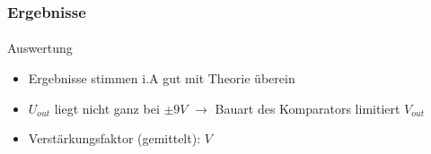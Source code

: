 \begin{frame}
\frametitle{Ergebnisse}
\framesubtitle{} 
    \begin{block}{Auswertung}
        \begin{itemize}
            \item Ergebnisse stimmen i.A gut mit Theorie überein
            \item $U_{out}$ liegt nicht ganz bei $\pm 9V$ $\rightarrow$ Bauart
            des Komparators limitiert $V_{out}$
            \item Verstärkungsfaktor (gemittelt): $V$
        \end{itemize}
    \end{block}
\end{frame}

